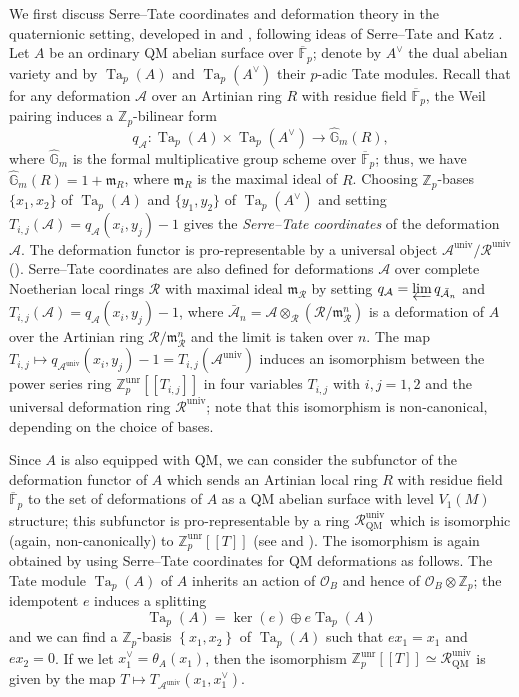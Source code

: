 \documentclass[a4paper,11pt]{amsart}
\numberwithin{equation}{section}
\theoremstyle{plain}
\theoremstyle{definition}
\theoremstyle{remark}
\newcommand{\Z}{\mathbb{Z}}
\newcommand{\F}{\mathbb{F}}
\newcommand{\G}{\mathbb{G}}
\DeclareMathOperator{\Ta}{Ta}
\newcommand{\univ}{\mathrm{univ}}
\newcommand{\unr}{\mathrm{unr}}
\newcommand{\invlim}{\mathop{\varprojlim}\limits}
\begin{document}
We first discuss Serre--Tate coordinates and deformation theory in the quaternionic setting, developed in \cite[\S3]{Mori} and \cite[\S4]{Brooks}, following ideas of Serre--Tate and Katz \cite{Kat}. Let $A$ be an ordinary QM abelian surface over $\overline{\F}_p$; denote by $A^\vee$ the dual abelian variety and by $\Ta_p(A)$ and $\Ta_p(A^\vee)$ their $p$-adic Tate modules. Recall that for any deformation $\mathcal{A}$ over an Artinian ring $R$ with residue field $\overline{\F}_p$, the Weil pairing induces a $\Z_p$-bilinear form
\[q_{\mathcal{A}}\colon \Ta_p(A) \times \Ta_p(A^\vee) \longrightarrow \widehat{\G}_m(R),\] 
where $\widehat{\G}_m$ is the formal multiplicative group scheme over $\overline{\F}_p$; thus, we have $\widehat{\G}_m({R})=1+\mathfrak{m}_{R}$, where $\mathfrak{m}_{R}$ is the maximal ideal of ${R}$. 
Choosing $\Z_p$-bases $\{x_1,x_2\}$ of $\Ta_p(A)$ and $\{y_1,y_2\}$ of $\Ta_p(A^\vee)$ and setting $T_{i,j}(\mathcal{A})=q_{\mathcal{A}}(x_i,y_j)-1$ gives the \emph{Serre--Tate coordinates} of the deformation $\mathcal{A}$. 
The deformation functor is pro-representable by a universal object $\mathcal{A}^\univ/\mathcal{R}^\univ$ (\cite[Theorem 2.1)]{Kat}). Serre--Tate coordinates are also defined for deformations $\mathcal{A}$ over complete Noetherian local rings $\mathcal{R}$ with maximal ideal $\mathfrak{m}_\mathcal{R}$ by setting 
$q_{\mathcal{A}}=\invlim q_{\bar{\mathcal{A}}_n}$ and $T_{i,j}(\mathcal{A})=q_{\mathcal{A}}(x_i,y_j)-1$, where $\bar{\mathcal{A}}_n=\mathcal{A}\otimes_\mathcal{R}(\mathcal{R}/\mathfrak{m}_\mathcal{R}^n)$ is a deformation of $A$ over the Artinian ring $\mathcal{R}/\mathfrak{m}_\mathcal{R}^n$ and the limit is taken over $n$. 
The map $T_{i,j}\mapsto q_{\mathcal{A}^\univ}(x_i,y_j)-1=T_{i,j}(\mathcal{A}^\mathrm{univ})$ induces an isomorphism between the power series ring $\Z_p^\unr[[T_{i,j}]]$ in four variables $T_{i,j}$ with $i,j=1,2$ and the universal deformation ring $\mathcal{R}^\univ$; note that this isomorphism is non-canonical, depending on the choice of bases.   

Since $A$ is also equipped with QM, we can consider the subfunctor of the deformation functor of $A$ which sends an Artinian local ring $R$ with residue field $\overline{\F}_p$ to the set of deformations of $A$ as a QM abelian surface with level $V_1(M)$ structure; this subfunctor is pro-representable by a ring $\mathcal{R}^\univ_\mathrm{QM}$ which is isomorphic (again, non-canonically) to $\Z_p^\unr[[T]]$ (see \cite[Proposition 3.3]{Mori} and \cite[Proposition 4.5]{Brooks}). The isomorphism is again obtained by using Serre--Tate coordinates for QM deformations as follows. The Tate module $\Ta_p(A)$ of $A$ inherits an action of $\mathcal{O}_B$ and hence of $\mathcal{O}_B \otimes \Z_p$; the idempotent $e$ induces a splitting 
\[\Ta_p(A) = \ker(e)\oplus e\Ta_p(A) \] 
and we can find a $\Z_p$-basis $\left\lbrace x_1,x_2\right\rbrace $ of $\Ta_p(A)$ such that $ex_1 = x_1$ and $ex_2 = 0$. If we let $x_1^\vee=\theta_A(x_1)$, then the isomorphism $\Z_p^\unr[[T]]\simeq\mathcal{R}^\univ_\mathrm{QM}$ is given by the map $T\mapsto T_{\mathcal{A}^\univ}(x_1,x_1^\vee)$. 
\end{document}
